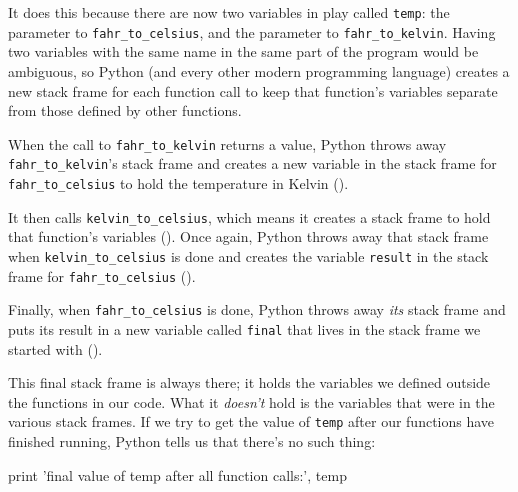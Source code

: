 \documentclass{book}
\begin{document}
It does this because there are now two variables in play called
\texttt{temp}: the parameter to \texttt{fahr\_to\_celsius}, and the
parameter to \texttt{fahr\_to\_kelvin}. Having two variables with the
same name in the same part of the program would be ambiguous, so Python
(and every other modern programming language) creates a new stack frame
for each function call to keep that function's variables separate from
those defined by other functions.

When the call to \texttt{fahr\_to\_kelvin} returns a value, Python
throws away \texttt{fahr\_to\_kelvin}'s stack frame and creates a new
variable in the stack frame for \texttt{fahr\_to\_celsius} to hold the
temperature in Kelvin ().



It then calls \texttt{kelvin\_to\_celsius}, which means it creates a
stack frame to hold that function's variables ().
Once again, Python throws away that stack frame when
\texttt{kelvin\_to\_celsius} is done and creates the variable
\texttt{result} in the stack frame for \texttt{fahr\_to\_celsius}
().


Finally, when \texttt{fahr\_to\_celsius} is done, Python throws away
\emph{its} stack frame and puts its result in a new variable called
\texttt{final} that lives in the stack frame we started with ().


This final stack frame is always there; it holds the variables we
defined outside the functions in our code. What it \emph{doesn't} hold
is the variables that were in the various stack frames. If we try to get
the value of \texttt{temp} after our functions have finished running,
Python tells us that there's no such thing:

\begin{VerbIn}
print 'final value of temp after all function calls:', temp
\end{VerbIn}
\end{document}
